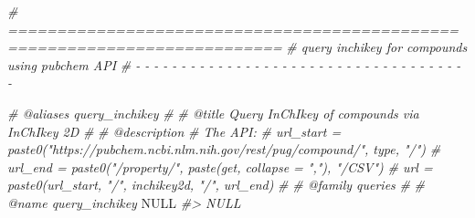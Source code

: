 \documentclass[
]{article}
\newenvironment{Shaded}{\begin{snugshade}}{\end{snugshade}}
\newcommand{\CommentTok}[1]{\textcolor[rgb]{0.56,0.35,0.01}{\textit{#1}}}
\newcommand{\ConstantTok}[1]{\textcolor[rgb]{0.00,0.00,0.00}{#1}}
\begin{document}
\begin{Shaded}
\begin{Highlighting}[]
\CommentTok{\# ==========================================================================}
\CommentTok{\# query inchikey for compounds using pubchem API}
\CommentTok{\# {-} {-} {-} {-} {-} {-} {-} {-} {-} {-} {-} {-} {-} {-} {-} {-} {-} {-} {-} {-} {-} {-} {-} {-} {-} {-} {-} {-} {-} {-} {-} {-} {-} {-} {-} {-} {-}}

\CommentTok{\#\textquotesingle{} @aliases query\_inchikey}
\CommentTok{\#\textquotesingle{}}
\CommentTok{\#\textquotesingle{} @title Query InChIkey of compounds via \textquotesingle{}InChIkey 2D\textquotesingle{}}
\CommentTok{\#\textquotesingle{}}
\CommentTok{\#\textquotesingle{} @description }
\CommentTok{\#\textquotesingle{} The API:}
\CommentTok{\#\textquotesingle{} url\_start = paste0("https://pubchem.ncbi.nlm.nih.gov/rest/pug/compound/", type, "/")}
\CommentTok{\#\textquotesingle{} url\_end = paste0("/property/", paste(get, collapse = ","), "/CSV")}
\CommentTok{\#\textquotesingle{} url = paste0(url\_start, "/", inchikey2d, "/", url\_end)}
\CommentTok{\#\textquotesingle{} }
\CommentTok{\#\textquotesingle{} @family queries}
\CommentTok{\#\textquotesingle{}}
\CommentTok{\#\textquotesingle{} @name query\_inchikey}
\ConstantTok{NULL}
\CommentTok{\#\textgreater{} NULL}


\end{Highlighting}
\end{Shaded}
\end{document}
